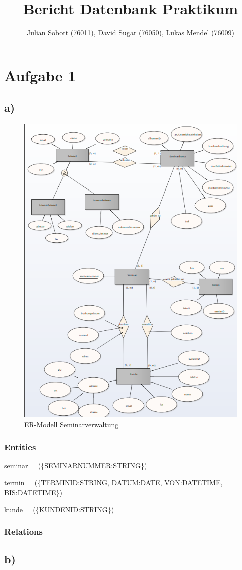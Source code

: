 \documentclass[10pt,a4paper]{report}
\author{Julian Sobott (76011), David Sugar (76050), Lukas Mendel (76009)}
\title{Bericht Datenbank Praktikum}
\begin{document}
\maketitle
\tableofcontents

\newpage
\section{Aufgabe 1}
\subsection{a)}
\begin{figure}[h]
	\includegraphics[scale=0.7]{Bilder/ER-Modell.PNG}
	\caption{ER-Modell Seminarverwaltung}
	\label{er:1}
\end{figure}

\subsubsection{Entities}
seminar = (\{\underline{SEMINARNUMMER:STRING}\})

termin  = (\{\underline{TERMINID:STRING}, DATUM:DATE, VON:DATETIME, BIS:DATETIME\})

kunde   = (\{\underline{KUNDENID:STRING}\})

\subsubsection{Relations}

\subsection{b)}
\end{document}
